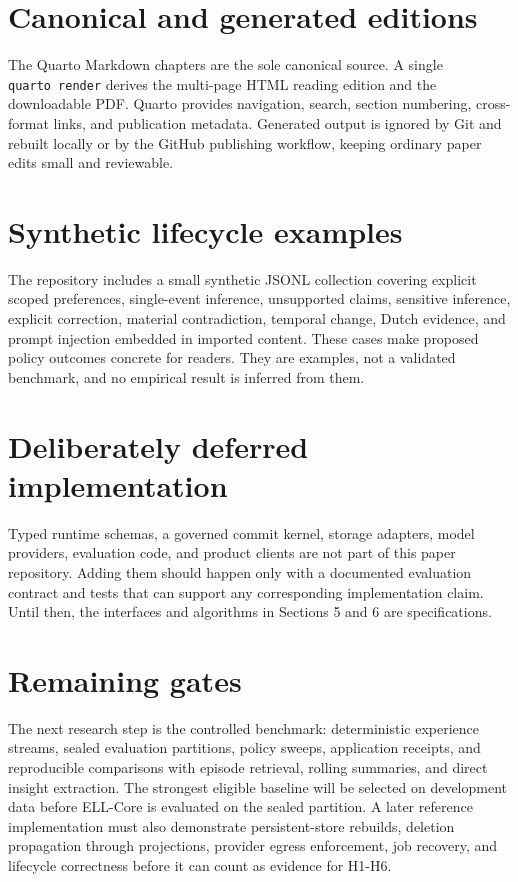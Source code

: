 \documentclass[
  english,
  a4paper,
  DIV=11,
  numbers=noendperiod]{scrreprt}
\begin{document}
\section{Canonical and generated
editions}\label{canonical-and-generated-editions}

The Quarto Markdown chapters are the sole canonical source. A single
\texttt{quarto\ render} derives the multi-page HTML reading edition and
the downloadable PDF. Quarto provides navigation, search, section
numbering, cross-format links, and publication metadata. Generated
output is ignored by Git and rebuilt locally or by the GitHub publishing
workflow, keeping ordinary paper edits small and reviewable.

\section{Synthetic lifecycle
examples}\label{synthetic-lifecycle-examples}

The repository includes a small synthetic JSONL collection covering
explicit scoped preferences, single-event inference, unsupported claims,
sensitive inference, explicit correction, material contradiction,
temporal change, Dutch evidence, and prompt injection embedded in
imported content. These cases make proposed policy outcomes concrete for
readers. They are examples, not a validated benchmark, and no empirical
result is inferred from them.

\section{Deliberately deferred
implementation}\label{deliberately-deferred-implementation}

Typed runtime schemas, a governed commit kernel, storage adapters, model
providers, evaluation code, and product clients are not part of this
paper repository. Adding them should happen only with a documented
evaluation contract and tests that can support any corresponding
implementation claim. Until then, the interfaces and algorithms in
Sections 5 and 6 are specifications.

\section{Remaining gates}\label{remaining-gates}

The next research step is the controlled benchmark: deterministic
experience streams, sealed evaluation partitions, policy sweeps,
application receipts, and reproducible comparisons with episode
retrieval, rolling summaries, and direct insight extraction. The
strongest eligible baseline will be selected on development data before
ELL-Core is evaluated on the sealed partition. A later reference
implementation must also demonstrate persistent-store rebuilds, deletion
propagation through projections, provider egress enforcement, job
recovery, and lifecycle correctness before it can count as evidence for
H1-H6.
\end{document}
